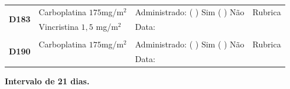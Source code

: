 \documentclass[11pt,a4paper,oldfontcommands]{memoir}
\begin{document}
\begin{center}
\begin{table}[H]
\begin{tabular}{p{1.3cm}p{4.9cm}|p{4.7cm}|p{3cm}}
    \\
    \hline
    \\
    \hline
    \multicolumn{1}{c|}{\multirow{2}{*}{\textbf{D183}}}&{Carboplatina \(175\)mg/m\(^2\)}&{Administrado: (  ) Sim (  ) Não}&{Rubrica}\\
    \multicolumn{1}{c|}{}&{Vincristina \(1,5\) mg/m\(^2\)}&{Data:}&\\
    \hline
    \\
    \hline
    \multicolumn{1}{c|}{\multirow{2}{*}{\textbf{D190}}}&{Carboplatina \(175\)mg/m\(^2\)}&{Administrado: (  ) Sim (  ) Não}&{Rubrica}\\
	\multicolumn{1}{c|}{}&&{Data:}&\\
    \hline
\end{tabular}
\end{table}
\textbf{Intervalo de 21 dias.}


\end{center}
\end{document}

